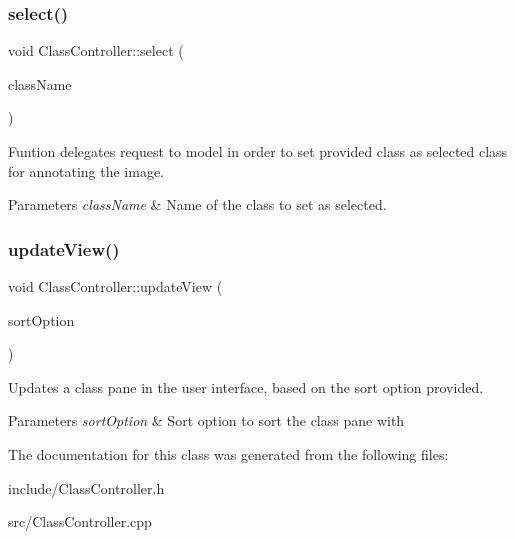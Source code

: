 \subsubsection{\texorpdfstring{select()}{select()}}
{\footnotesize\ttfamily void Class\+Controller\+::select (\begin{DoxyParamCaption}\item[{const Q\+String \&}]{class\+Name }\end{DoxyParamCaption})}



Funtion delegates request to model in order to set provided class as selected class for annotating the image. 


\begin{DoxyParams}{Parameters}
{\em class\+Name} & Name of the class to set as selected. \\
\hline
\end{DoxyParams}
\mbox{\label{classClassController_a7296a8879b4aa942920d1fa77a146d5b}} 
\subsubsection{\texorpdfstring{update\+View()}{updateView()}}
{\footnotesize\ttfamily void Class\+Controller\+::update\+View (\begin{DoxyParamCaption}\item[{const Q\+String \&}]{sort\+Option }\end{DoxyParamCaption})}



Updates a class pane in the user interface, based on the sort option provided. 


\begin{DoxyParams}{Parameters}
{\em sort\+Option} & Sort option to sort the class pane with \\
\hline
\end{DoxyParams}


The documentation for this class was generated from the following files\+:\begin{DoxyCompactItemize}
\item 
include/Class\+Controller.\+h\item 
src/Class\+Controller.\+cpp\end{DoxyCompactItemize}
